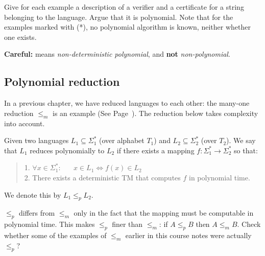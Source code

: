 Give for each example a description of a verifier and a certificate
for a string belonging to the language. Argue that it is
polynomial. Note that for the examples marked with (*), no polynomial
algorithm is known, neither whether one exists.

{\bf Careful:} \NP means {\em non-deterministic polynomial},
and {\bf not} {\em non-polynomial}.

\subsection{Polynomial reduction}

In a previous chapter, we have reduced languages to each other: the
many-one reduction $\leq_m$ {\mbox is an example} (See
Page~\pageref{manyone}). The reduction below takes
complexity into account.

\begin{definition}
Given two languages $L_1\subseteq \Sigma_1^*$ (over alphabet $T_1$)
and $L_2\subseteq \Sigma_2^*$ (over $T_2$). We say that $L_1$
reduces polynomially to $L_2$ if there exists a mapping $f:\Sigma_1^*
\rightarrow \Sigma_2^*$ so that:
\begin{verse}
1. $\forall x\in \Sigma_1^*$: \ \ \ $x\in L_1\Leftrightarrow f(x)\in
L_2$\\[2mm] 2. There exists a deterministic TM that computes $f$ in
polynomial time.
\end{verse}
We denote this by $L_1 \leq_p  L_2$.
\end{definition}

$\leq_p$ differs from $\leq_m$ only in the fact that the mapping must
be computable in polynomial time. This makes $\leq_p$ finer than $\leq_m$:
if $A \leq_p B$ then $A \leq_m B$. Check whether some of the examples
of $\leq_m$ earlier in this course notes were actually $\leq_p$?

